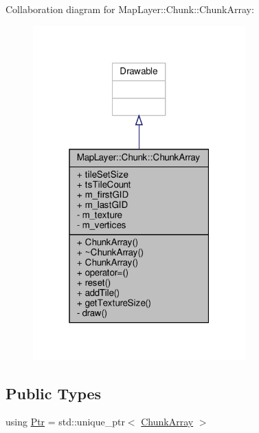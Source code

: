 Collaboration diagram for Map\+Layer\+:\+:Chunk\+:\+:Chunk\+Array\+:
\nopagebreak
\begin{figure}[H]
\begin{center}
\leavevmode
\includegraphics[width=232pt]{classMapLayer_1_1Chunk_1_1ChunkArray__coll__graph}
\end{center}
\end{figure}
\subsection*{Public Types}
\begin{DoxyCompactItemize}
\item 
using \hyperlink{classMapLayer_1_1Chunk_1_1ChunkArray_a6d944dee2fc89a76d7a252405e2732b0}{Ptr} = std\+::unique\+\_\+ptr$<$ \hyperlink{classMapLayer_1_1Chunk_1_1ChunkArray}{Chunk\+Array} $>$
\end{DoxyCompactItemize}
